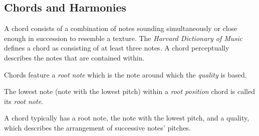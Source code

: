\subsection{Chords and Harmonies}

A chord consists of a combination of notes sounding simultaneously or close enough in succession to resemble a texture. The \textit{Harvard Dictionary of Music} defines a chord as consisting of at least three notes\cite{harvdict}. A chord perceptually describes the notes that are contained within.

Chords feature a \textit{root note} which is the note around which the \textit{quality} is based.

The lowest note (note with the lowest pitch) within a \textit{root position} chord is called its \textit{root note}.

A chord typically has a root note, the note with the lowest pitch, and a quality, which describes the arrangement of successive notes' pitches.